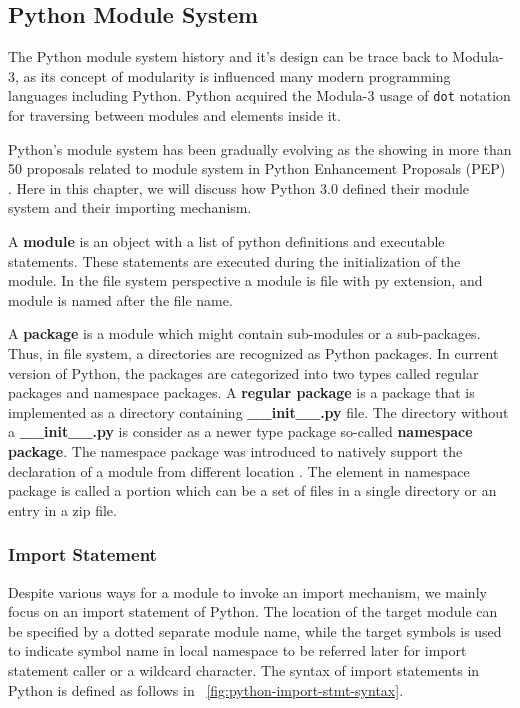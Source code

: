 


\subsection{Python Module System}

The Python module system history and it's design can be trace back to Modula-3, as its concept of modularity is influenced many modern programming languages including Python.
Python acquired the Modula-3 usage of \texttt{dot} notation for traversing between modules and elements inside it.

Python’s module system has been gradually evolving as the showing in more than 50 proposals related to module system in Python Enhancement Proposals (PEP) \cite{pep0}. Here in this chapter, we will discuss how Python 3.0 defined their module system and their importing mechanism.

A \textbf{module} is an object with a list of python definitions and executable statements. These statements are executed during the initialization of the module. In the file system perspective a module is file with py extension, and module is named after the file name.

A \textbf{package} is a module which might contain sub-modules or a sub-packages.
Thus, in file system, a directories are recognized as Python packages.
In current version of Python, the packages are categorized into two types called regular packages and namespace packages.
A \textbf{regular package} is a package that is implemented as a directory containing \textbf{\_\_init\_\_.py} file.
The directory without a \textbf{\_\_init\_\_.py} is consider as a newer type package so-called \textbf{namespace package}.
The namespace package was introduced to natively support the declaration of a module from different location \cite{pep420}. The element in namespace package is called a portion which can be a set of files in a single directory or an entry in a zip file.

\subsubsection{Import Statement}

Despite various ways for a module to invoke an import mechanism, we mainly focus on an import statement of Python.
The location of the target module can be specified by a dotted separate module name, while the target symbols is used to indicate symbol name in local namespace to be referred later for import statement caller or a wildcard character.
The syntax of import statements in Python is defined as follows in ~\ref{fig:python-import-stmt-syntax}.

